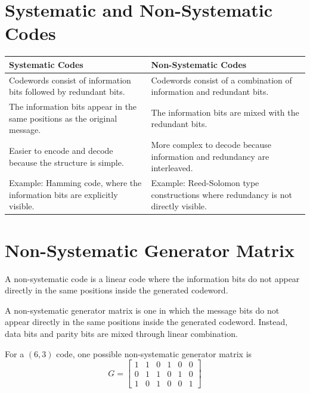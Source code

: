 \documentclass[11pt,a4paper]{book}
\renewcommand{\arraystretch}{1.4}
\newenvironment{definitionbox}[1][Definition]{%
    \begin{tcolorbox}[
        enhanced,
        breakable,
        colback=primaryblue!10,
        colframe=primaryblue!150,
        title=#1,
        fonttitle=\bfseries,
        sharp corners,
        boxrule=0.8pt,
        left=8pt,
        right=8pt,
        top=6pt,
        bottom=6pt
    ]
}{\end{tcolorbox}}
\begin{document}
\section{Systematic and Non-Systematic Codes}

\begin{center}
\renewcommand{\arraystretch}{1.6}
\setlength{\tabcolsep}{8pt}
\begin{tabular}{|L{8cm}|L{8cm}|}
\hline
\textbf{Systematic Codes} & \textbf{Non-Systematic Codes} \\
\hline
Codewords consist of information bits followed by redundant bits. & Codewords consist of a combination of information and redundant bits. \\
\hline
The information bits appear in the same positions as the original message. & The information bits are mixed with the redundant bits. \\
\hline
Easier to encode and decode because the structure is simple. & More complex to decode because information and redundancy are interleaved. \\
\hline
Example: Hamming code, where the information bits are explicitly visible. & Example: Reed-Solomon type constructions where redundancy is not directly visible. \\
\hline
\end{tabular}
\end{center}

\section{Non-Systematic Generator Matrix}
\begin{definitionbox}[Non-Systematic Code]
A non-systematic code is a linear code where the information bits do not appear directly in the same positions inside the generated codeword.
\end{definitionbox}

\begin{definitionbox}[Non-Systematic Generator Matrix]
A non-systematic generator matrix is one in which the message bits do not appear directly in the same positions inside the generated codeword. Instead, data bits and parity bits are mixed through linear combination.
\end{definitionbox}

For a \((6,3)\) code, one possible non-systematic generator matrix is
\[
G=
\begin{bmatrix}
1&1&0&1&0&0\\
0&1&1&0&1&0\\
1&0&1&0&0&1
\end{bmatrix}
\]
\end{document}
